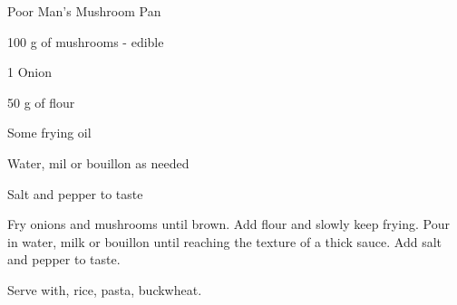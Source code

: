 \begin{recipe}{Poor Man's Mushroom Pan}
    \begin{ingr}[1]
    \item 100 g of mushrooms - edible
    \item 1 Onion
    \item 50 g of flour
    \item Some frying oil
    \item Water, mil or bouillon as needed
    \item Salt and pepper to taste
    \end{ingr}

    Fry onions and mushrooms until brown. Add flour and
    slowly keep frying.
    Pour in water, milk or bouillon until reaching the texture of a thick sauce.
    Add salt and pepper to taste.

    Serve with, rice, pasta, buckwheat.
\end{recipe}
